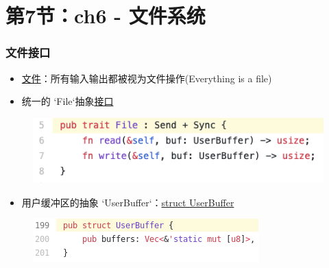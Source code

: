 \section{第7节：ch6 - 文件系统}%
% 
% 
\begin{frame}
	\frametitle{文件接口}
% 
		\begin{itemize}
		\item \href{https://rcore-os.github.io/rCore-Tutorial-Book-v3/chapter6/1file-descriptor.html\#id3}{文件}：所有输入输出都被视为文件操作(Everything is a file)
		\item 统一的 `File`抽象\href{https://github.com/rcore-os/rCore-Tutorial-v3/blob/ch6/os/src/fs/mod.rs\#L5}{接口}
		\end{itemize}
    \begin{figure}
        \centering
        \includegraphics[width=0.6\linewidth]{lecture04/figs/mod-L5.png}
    \end{figure}
% 
% 
		\begin{itemize}
		\item 用户缓冲区的抽象 `UserBuffer`：\href{https://github.com/rcore-os/rCore-Tutorial-v3/blob/ch6/os/src/mm/page_table.rs\#L199}{struct UserBuffer}
		\end{itemize}
    \begin{figure}
        \centering
        \includegraphics[width=0.6\linewidth]{figs/page_table-L199.png}
    \end{figure}
% 
% 
\end{frame}
